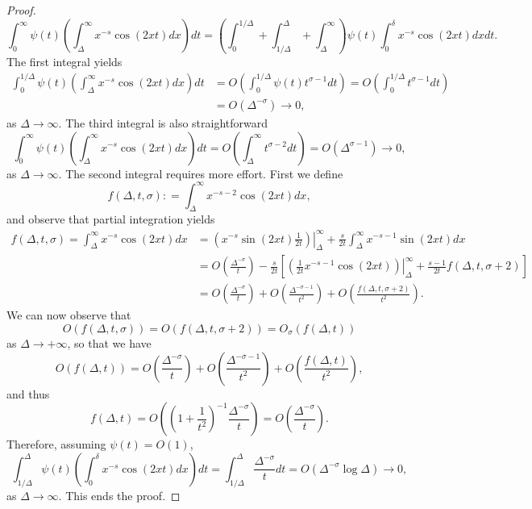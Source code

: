 \documentclass[11pt]{article}
\numberwithin{equation}{section}		 			%
\numberwithin{figure}{section}			 			%
\begin{document}
\begin{proof}
\[\int_0^\infty  {\psi (t)\left( {\int_\Delta ^\infty  {{x^{ - s}}\cos (2xt)dx} } \right)dt}  = \left( {\int_0^{1/\Delta } {}  + \int_{1/\Delta }^\Delta  {}  + \int_\Delta ^\infty  {} } \right)\psi (t)\int_0^\delta  {{x^{ - s}}\cos (2xt)dx} dt.\]
The first integral yields
\begin{align}
  \int_0^{1/\Delta } {\psi (t)\left( {\int_\Delta ^\infty  {{x^{ - s}}\cos (2xt)dx} } \right)dt} & = O\left( {\int_0^{1/\Delta } {\psi (t){t^{\sigma  - 1}}dt} } \right) = O\left( {\int_0^{1/\Delta } {{t^{\sigma  - 1}}dt} } \right) \nonumber \\
   &= O({\Delta ^{ - \sigma }}) \to 0, \nonumber 
\end{align}
as $\Delta \to \infty$. The third integral is also straightforward
\[\int_0^\infty  {\psi (t)\left( {\int_\Delta ^\infty  {{x^{ - s}}\cos (2xt)dx} } \right)dt}  = O\left( {\int_\Delta ^\infty  {{t^{\sigma  - 2}}dt} } \right) = O({\Delta ^{\sigma  - 1}}) \to 0,\]
as $\Delta \to \infty$. The second integral requires more effort. First we define
\[f(\Delta ,t, \sigma): = \int_\Delta ^\infty  {{x^{ - s - 2}}\cos (2xt)dx}, \]
and observe that partial integration yields
\begin{align}
 f(\Delta ,t, \sigma) = \int_\Delta ^\infty  {{x^{ - s}}\cos (2xt)dx} &=  \left. {\left( {{x^{ - s}}\sin (2xt)\frac{1}{{2t}}} \right)} \right|_\Delta ^\infty + \frac{s}{{2t}}\int_\Delta ^\infty  {{x^{ - s - 1}}\sin (2xt)dx}  \nonumber \\
   &= O\left( {\frac{{{\Delta ^{ - \sigma }}}}{t}} \right) - \frac{s}{{2t}}\left[ {\left. {\left( {\frac{1}{{2t}}{x^{ - s - 1}}\cos (2xt)} \right)} \right|_\Delta ^\infty  + \frac{{s - 1}}{{2t}}f(\Delta ,t, \sigma + 2)} \right] \nonumber \\
   &= O\left( {\frac{{{\Delta ^{ - \sigma }}}}{t}} \right) + O\left( {\frac{{{\Delta ^{ - \sigma  - 1}}}}{{{t^2}}}} \right) + O\left( {\frac{{f(\Delta ,t, \sigma + 2)}}{{{t^2}}}} \right).\nonumber 
\end{align}
We can now observe that 
\[
 O(f(\Delta ,t, \sigma)) = O(f(\Delta ,t, \sigma + 2)) = O_{\sigma}(f(\Delta ,t))
\]
as $\Delta \to + \infty$, so that we have
\[O(f(\Delta ,t)) = O\left( {\frac{{{\Delta ^{ - \sigma }}}}{t}} \right) + O\left( {\frac{{{\Delta ^{ - \sigma  - 1}}}}{{{t^2}}}} \right) + O\left( {\frac{{f(\Delta ,t)}}{{{t^2}}}} \right),\]
and thus
\[f(\Delta ,t) = O\left( {{{\left( {1 + \frac{1}{{{t^2}}}} \right)}^{ - 1}}\frac{{{\Delta ^{ - \sigma }}}}{t}} \right) = O\left( {\frac{{{\Delta ^{ - \sigma }}}}{t}} \right).\]
Therefore, assuming $\psi(t) = O(1)$,
\[
 \int_{1/\Delta}^{\Delta}  {\psi (t)\left( {\int_0^\delta  {{x^{ - s}}\cos (2xt)dx} } \right)dt} = \int_{1/\Delta}^{\Delta} \frac{\Delta^{-\sigma}}{t} dt = O( \Delta^{-\sigma} \log \Delta) \to 0,
\]
as $\Delta \to \infty$. This ends the proof.
\end{proof}
\end{document}
